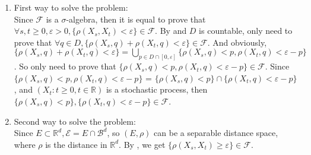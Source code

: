 \documentclass{ctexart}
\begin{document}
\begin{solution}
  \begin{enumerate}
    \item First way to solve the problem:\\
      Since \(\mathscr{F} \) is a \(\sigma\)-algebra, then it is equal to
      prove that \(\forall s,t \geq 0, \varepsilon > 0, \{\rho(X_s,X_t) < \varepsilon\} \in \mathscr{F}\).
      By  and \(D\) is countable, only need to prove that \(\forall q \in D, \{\rho(X_s,q)+ \rho(X_t,q) < \varepsilon\} \in \mathscr{F}\).
      And obviously, \(\{\rho(X_s,q) + \rho(X_t,q) < \varepsilon\} = \bigcup_{p \in D \cap [0, \varepsilon]}\{\rho(X_s,q)< p, \rho(X_t,q)< \varepsilon - p\}\).
      So only need to prove that \(\{\rho(X_s,q) < p , \rho(X_t,q) < \varepsilon - p\} \in \mathscr{F}\).
      Since \(\{\rho(X_s,q) < p , \rho(X_t,q) < \varepsilon - p\}\)
      = \(\{\rho(X_s,q) < p\}\cap \{\rho(X_t,q) < \varepsilon - p\} \),
      and \((X_t: t \geq 0, t \in \mathbb{R})\) is a stochastic process,
      then \(\{\rho(X_s,q) < p\}, \{\rho(X_t,q) < \varepsilon - p\} \in \mathscr{F}\).
    \item Second way to solve the problem:\\
      Since \(E \subset \mathbb{R}^d, \mathscr{E} = E \cap \mathscr{B}^d\), so \((E, \rho)\) can be a separable distance space,
      where \(\rho\) is the distance in \(\mathbb{R}^d\). By , we get \(\{\rho(X_s,X_t) \geq \varepsilon\} \in \mathscr{F} \).
  \end{enumerate}
\end{solution}
\end{document}
